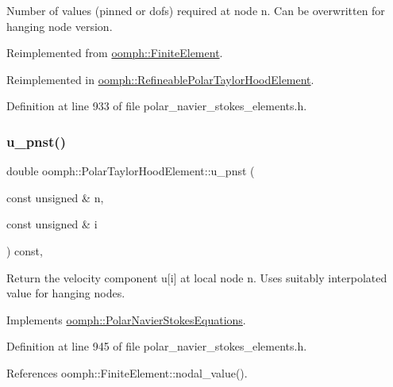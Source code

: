 Number of values (pinned or dofs) required at node n. Can be overwritten for hanging node version. 



Reimplemented from \hyperlink{classoomph_1_1FiniteElement_a56610c60d5bc2d7c27407a1455471b1a}{oomph\+::\+Finite\+Element}.



Reimplemented in \hyperlink{classoomph_1_1RefineablePolarTaylorHoodElement_aa04615fc715f41d0d4e32d6f9b22e444}{oomph\+::\+Refineable\+Polar\+Taylor\+Hood\+Element}.



Definition at line 933 of file polar\+\_\+navier\+\_\+stokes\+\_\+elements.\+h.

\mbox{\label{classoomph_1_1PolarTaylorHoodElement_a7a584a50123314fdfc35798e8c604383}} 
\subsubsection{\texorpdfstring{u\+\_\+pnst()}{u\_pnst()}\hspace{0.1cm}{\footnotesize\ttfamily [1/2]}}
{\footnotesize\ttfamily double oomph\+::\+Polar\+Taylor\+Hood\+Element\+::u\+\_\+pnst (\begin{DoxyParamCaption}\item[{const unsigned \&}]{n,  }\item[{const unsigned \&}]{i }\end{DoxyParamCaption}) const\hspace{0.3cm}{\ttfamily [inline]}, {\ttfamily [virtual]}}



Return the velocity component u\mbox{[}i\mbox{]} at local node n. Uses suitably interpolated value for hanging nodes. 



Implements \hyperlink{classoomph_1_1PolarNavierStokesEquations_ae4bfb7b4c54bf5558111f84119f530d0}{oomph\+::\+Polar\+Navier\+Stokes\+Equations}.



Definition at line 945 of file polar\+\_\+navier\+\_\+stokes\+\_\+elements.\+h.



References oomph\+::\+Finite\+Element\+::nodal\+\_\+value().

